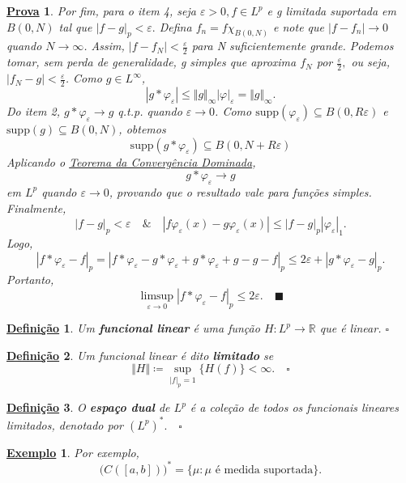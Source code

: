 \documentclass{article}
\newtheorem*{def*}{\underline{Defini\c c\~ao}}
\newtheorem{example}{\underline{Exemplo}}
\newtheorem*{proof*}{\underline{Prova}}
\renewcommand\qedsymbol{$\blacksquare$}
\begin{document}
\begin{proof*}
  Por fim, para o item 4, seja \(\varepsilon > 0, f\in L^{p}\) e g limitada suportada em \(B(0, N)\) tal que \(|f-g|_{p}< \varepsilon .\) Defina \(f_{n} = f\chi_{B(0, N)}\) e note que \(|f-f_{n}|\to 0\) quando \(N\to \infty\). Assim, 
  \(|f-f_{N}|<\frac{\varepsilon }{2}\) para N suficientemente grande. Podemos tomar, sem perda de generalidade, g simples que aproxima \(f_{N}\) por \(\frac{\varepsilon }{2},\) ou seja, \(|f_{N}-g|<\frac{\varepsilon }{2}\). Como \(g\in L^{\infty}\), 
  \[
    |g*\varphi_{\varepsilon }|\leq \Vert g \Vert_{\infty}|\varphi |_{\varepsilon } = \Vert g \Vert_{\infty}.
  \]
  Do item 2, \(g*\varphi_{\varepsilon }\to g\) q.t.p. quando \(\varepsilon \to 0\). Como \(\mathrm{supp}(\varphi_{\varepsilon })\subseteq B(0, R\varepsilon )\) e \(\mathrm{supp}(g)\subseteq B(0, N)\), obtemos 
    \[
      \mathrm{supp}(g*\varphi_{\varepsilon })\subseteq B(0, N + R\varepsilon )
    \]
  Aplicando o \hyperlink{dominated_convergence}{\textit{Teorema da Convergência Dominada}}, 
    \[
      g*\varphi_{\varepsilon }\to g
    \]
  em \(L^{p}\) quando \(\varepsilon \to 0\), provando que o resultado vale para funções simples. Finalmente, 
    \[
      |f-g|_{p} <\varepsilon \quad\&\quad |f \varphi_{\varepsilon }(x) - g \varphi_{\varepsilon }(x)| \leq |f-g|_{p}|\varphi_{\varepsilon }|_{1}.
    \]
  Logo, 
    \[
      |f*\varphi_{\varepsilon } - f|_{p} = |f*\varphi_{\varepsilon } - g*\varphi_{\varepsilon } + g*\varphi_{\varepsilon } + g - g - f|_{p}\leq 2\varepsilon + |g*\varphi_{\varepsilon }-g|_{p}.
    \]
  Portanto,
    \[
      \limsup_{\varepsilon \to 0}|f*\varphi_{\varepsilon }-f|_p \leq 2\varepsilon.\quad \text{\qedsymbol}
    \]
\end{proof*}
 \begin{def*}
   Um \textbf{funcional linear} é uma função \(H:L^{p}\rightarrow \mathbb{R}\) que é linear. \(\square\)
 \end{def*}
\begin{def*}
  Um funcional linear é dito \textbf{limitado} se 
    \[
      \Vert H \Vert\coloneqq \sup_{|f|_{p}=1}\{H(f)\} < \infty.\quad \square
    \]
\end{def*}
 \begin{def*}
   O \textbf{espaço dual} de \(L^{p}\) é a coleção de todos os funcionais lineares limitados, denotado por \((L^{p})^{*}.\quad \square\)
 \end{def*}
\begin{example}
  Por exemplo,
    \[
      \biggl(C([a, b])\biggr)^{*} = \{\mu : \mu \text{ é medida suportada}\}.
    \]
\end{example}
\end{document}
